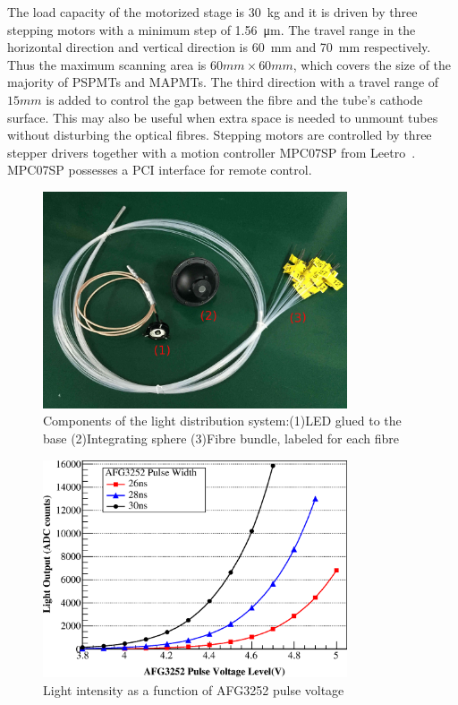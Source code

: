 \documentclass[review,number,sort&compress]{elsarticle}
\begin{document}
The load capacity of the motorized stage is \SI{30}{\kilo\gram} and it is driven by three stepping motors with a minimum step of \SI{1.56}{\micro\meter}.%
The travel range in the horizontal direction and vertical direction is \SI{60}{\milli\meter} and \SI{70}{\milli\meter} respectively.%
Thus the maximum scanning area is $60mm\times60mm$, which covers the size of the majority of PSPMTs and MAPMTs.
The third direction with a travel range of $15mm$ is added to control the gap between the fibre and the tube's cathode surface.
This may also be useful when extra space is needed to unmount tubes without disturbing the optical fibres. 
Stepping motors are controlled by three stepper drivers together with a motion controller MPC07SP from Leetro~\cite{leetro}.
MPC07SP possesses a PCI interface for remote control.

\begin{figure}
 \centering
 \includegraphics[width=90mm]{fibre_led_insphere_crop}
\caption{Components of the light distribution system:(1)LED glued to the base (2)Integrating sphere (3)Fibre bundle, labeled for each fibre}
\label{fig:fibre_led_sphere}
\end{figure} 

\begin{figure}
 \centering
 \includegraphics[width=90mm]{intesityVSvoltage}
\caption{Light intensity as a function of AFG3252 pulse voltage}
\label{fig:afg3252_intensityVSvoltage}
\end{figure} 
\end{document}
